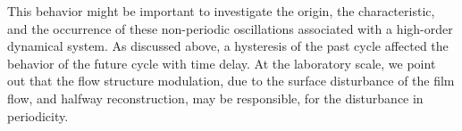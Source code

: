 \documentclass[aps,pre,preprint,groupedaddress,showkeys]{revtex4-2}
\begin{document}
This behavior might be important to investigate the origin, the characteristic, and the occurrence of these non-periodic oscillations associated with a high-order dynamical system.
As discussed above, a hysteresis of the past cycle affected the behavior of the future cycle with time delay.
At the laboratory scale, we point out that the flow structure modulation, due to the surface disturbance of the film flow, and halfway reconstruction, may be responsible, for the disturbance in periodicity.

%


\end{document}
